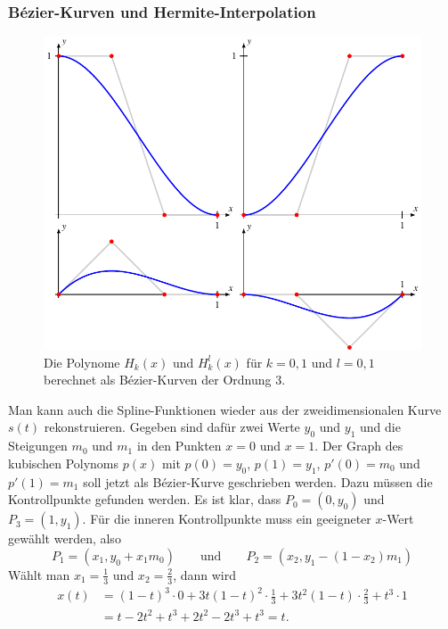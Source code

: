 %
%
\subsubsection{Bézier-Kurven und Hermite-Interpolation}
\begin{figure}
\centering
\includegraphics{chapters/30-interpolation/figures/bezierhermite.pdf}
\caption{Die Polynome $H_k(x)$ und $H_k^l(x)$ für $k=0,1$ und $l=0,1$
berechnet als Bézier-Kurven der Ordnung 3.
\label{buch:bezier:figure:bezierhermite}}
\end{figure}
Man kann auch die Spline-Funktionen wieder aus der zweidimensionalen
Kurve $s(t)$ rekonstruieren.
%
%
%
Gegeben sind dafür zwei Werte $y_0$ und $y_1$ und die Steigungen $m_0$ und
$m_1$ in den Punkten $x=0$ und $x=1$.
Der Graph des kubischen Polynoms $p(x)$ mit $p(0)=y_0$, $p(1)=y_1$,
$p'(0)=m_0$ und $p'(1)=m_1$ soll jetzt als Bézier-Kurve geschrieben werden.
Dazu müssen die Kontrollpunkte gefunden werden.
%
Es ist klar, dass $P_0=(0,y_0)$ und $P_3=(1,y_1)$.
Für die inneren Kontrollpunkte muss ein geeigneter $x$-Wert gewählt werden,
also
\[
P_1=
(x_1,y_0+x_1m_0)
\qquad
\text{und}
\qquad
P_2
=
(x_2,y_1-(1-x_2)m_1)
\]
Wählt man $x_1=\frac13$ und $x_2=\frac23$, dann wird
\begin{align*}
x(t)
&=
(1-t)^3\cdot 0 + 3t(1-t)^2\cdot \frac13 + 3t^2(1-t)\cdot \frac23 + t^3\cdot 1
\\
&=
t-2t^2+t^3 + 2t^2 -2t^3 + t^3 = t.
\end{align*}
